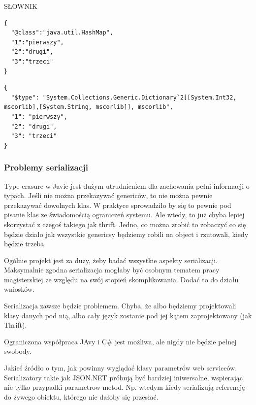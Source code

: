 SŁOWNIK
\begin{lstlisting}[float, frame=single, caption={Jackson daje. Słownik}, label=kod:jackson-dict-serilization]
{
  "@class":"java.util.HashMap",
  "1":"pierwszy",
  "2":"drugi",
  "3":"trzeci"
}
\end{lstlisting}


\begin{lstlisting}[float, frame=single, caption={JSON.NET daje. Słownik}, label=kod:json-net-dict-serilization]
{
  "$type": "System.Collections.Generic.Dictionary`2[[System.Int32, mscorlib],[System.String, mscorlib]], mscorlib",
  "1": "pierwszy",
  "2": "drugi",
  "3": "trzeci"
}
\end{lstlisting}

\subsubsection{Problemy serializacji}
Type erasure w Javie jest dużym utrudnieniem dla zachowania pełni informacji o typach.
Jeśli nie można przekazywać genericów, to nie można pewnie przekazywać dowolnych klas. W praktyce sprowadziło by się to pewnie pod pisanie klas ze świadomością ograniczeń systemu. Ale wtedy, to już chyba lepiej skorzystać z czegoś takiego jak thrift.
Jedno, co można zrobić to zobaczyć co się będzie działo jak wszystkie genericsy będziemy robili na object i rzutowali, kiedy będzie trzeba.

Ogólnie projekt jest za duży, żeby badać wszystkie aspekty serializacji. Maksymalnie zgodna serializacja mogłaby być osobnym tematem pracy magisterskiej ze względu na swój stopień skomplikowania.
Dodać to do działu wniosków.

Serializacja zawsze będzie problemem. Chyba, że albo będziemy projektowali klasy danych pod nią, albo cały język zostanie pod jej kątem zaprojektowany (jak Thrift).

Ograniczona współpraca JAvy i C\# jest możliwa, ale nigdy nie będzie pełnej swobody.

Jakieś źródło o tym, jak powinny wyglądać klasy parametrów web serviceów.
Serializatory takie jak JSON.NET próbują być bardziej iniwersalne, wspierając nie tylko przypadki parametrow metod. Np. wtedym kiedy serializują referencję do żywego obiektu, którego nie dałoby się przesłać.

